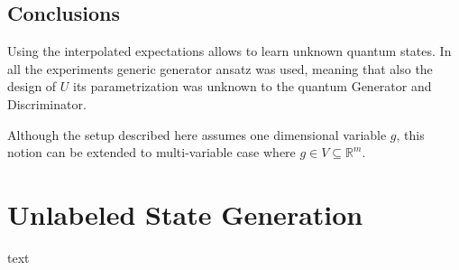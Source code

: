 \subsection{Conclusions}
Using the interpolated expectations allows to learn unknown quantum states.
In all the experiments generic generator ansatz was used, meaning that also the
design of $U$ its parametrization was unknown to the quantum Generator and
Discriminator.

Although the setup described here assumes one dimensional variable $g$, this
notion can be extended to multi-variable case where $g \in V \subseteq
\mathbb{R}^m$.



\section{Unlabeled State Generation}
text

